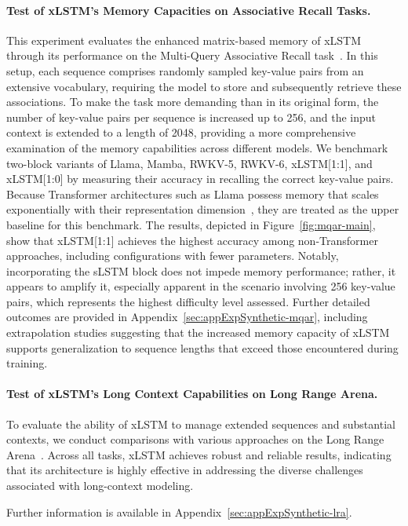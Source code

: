 \paragraph{Test of xLSTM's Memory Capacities on Associative Recall Tasks.} This experiment evaluates the enhanced matrix-based memory of xLSTM through its performance on the Multi-Query Associative Recall task~\citep{Arora:23arxiv}. In this setup, each sequence comprises randomly sampled key-value pairs from an extensive vocabulary, requiring the model to store and subsequently retrieve these associations. To make the task more demanding than in its original form, the number of key-value pairs per sequence is increased up to 256, and the input context is extended to a length of 2048, providing a more comprehensive examination of the memory capabilities across different models. We benchmark two-block variants of Llama, Mamba, RWKV-5, RWKV-6, xLSTM[1:1], and xLSTM[1:0] by measuring their accuracy in recalling the correct key-value pairs. Because Transformer architectures such as Llama possess memory that scales exponentially with their representation dimension~\citep{Ramsauer:21}, they are treated as the upper baseline for this benchmark. The results, depicted in Figure~\ref{fig:mqar-main}, show that xLSTM[1:1] achieves the highest accuracy among non-Transformer approaches, including configurations with fewer parameters. Notably, incorporating the sLSTM block does not impede memory performance; rather, it appears to amplify it, especially apparent in the scenario involving 256 key-value pairs, which represents the highest difficulty level assessed. Further detailed outcomes are provided in Appendix~\ref{sec:appExpSynthetic-mqar}, including extrapolation studies suggesting that the increased memory capacity of xLSTM supports generalization to sequence lengths that exceed those encountered during training.

\paragraph{Test of xLSTM's Long Context Capabilities on Long Range Arena.} To evaluate the ability of xLSTM to manage extended sequences and substantial contexts, we conduct comparisons with various approaches on the Long Range Arena~\citep{Tay:21}. Across all tasks, xLSTM achieves robust and reliable results, indicating that its architecture is highly effective in addressing the diverse challenges associated with long-context modeling.

Further information is available in Appendix~\ref{sec:appExpSynthetic-lra}.

